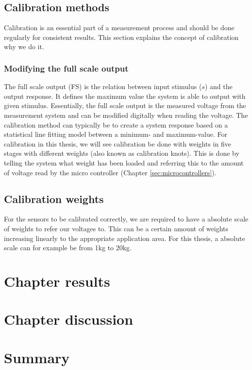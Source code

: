 \subsection{Calibration methods}
\label{subsec:calibrationmethods}
Calibration is an essential part of a measurement process and should be done regularly for consistent results. This section explains the concept of calibration why we do it.

\subsubsection{Modifying the full scale output}
The full scale output (FS) is the relation between input stimulus ($s$) and the output response. It defines the maximum value the system is able to output with given stimulus. Essentially, the full scale output is the measured voltage from the measurement system and can be modified digitally when reading the voltage.
The calibration method can typically be to create a system response based on a statistical line fitting model between a minimum- and maximum-value. For calibration in this thesis, we will see calibration be done with weights in five stages with different weights (also known as calibration knots). This is done by telling the system what weight has been loaded and referring this to the amount of voltage read by the micro controller (Chapter \ref{sec:microcontrollers}).

\subsection{Calibration weights}
For the sensors to be calibrated correctly, we are required to have a absolute scale of weights to refer our voltages to. This can be a certain amount of weights increasing linearly to the appropriate application area. For this thesis, a absolute scale can for example be from 1\si{\kilogram} to 20\si{\kilogram}.


\section{Chapter results}

\section{Chapter discussion}

\section{Summary}